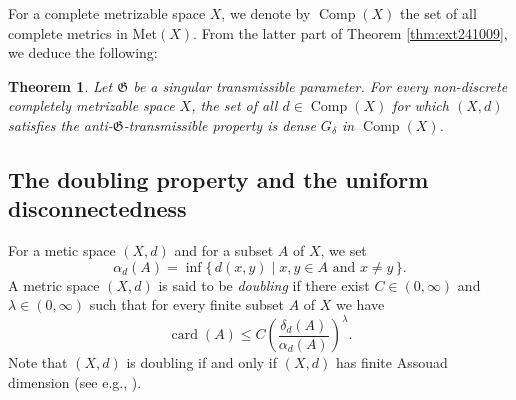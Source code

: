 \documentclass[a4paper, 12pt]{amsart}
\theoremstyle{plain}
\newtheorem{thm}{Theorem}[section]
\theoremstyle{definition}
\theoremstyle{remark}
\DeclareMathOperator{\card}{card}
\DeclareMathOperator{\cm}{Comp}
\newcommand{\met}[1]{\mathrm{Met}(#1)}
\begin{document}
For a complete metrizable space 
$X$, 
we denote by 
$\cm(X)$ the set of 
all complete metrics in 
$\met{X}$. 
From  the latter part of
Theorem 
\ref{thm:ext241009}, 
we deduce the following:
\begin{thm}\label{thm:cm1}
Let 
$\mathfrak{G}$ 
be a singular transmissible parameter. 
For every non-discrete completely metrizable space $X$, 
the set of all 
$d\in \cm(X)$ 
for which 
$(X, d)$ 
satisfies 
the anti-$\mathfrak{G}$-transmissible property 
is dense 
$G_{\delta}$ 
in 
$\cm(X)$.  
\end{thm}

\subsection{The doubling property and the uniform disconnectedness}
For a metic space 
$(X, d)$ 
and for a subset 
$A$ 
of 
$X$, 
we set  
	\[
	\alpha_{d}(A)=\inf\{\, d(x, y)\mid \text{$x, y\in A$ and $x\neq y$}\, \}.
	\] 
A metric space 
$(X, d)$ 
is said to be 
\emph{doubling} 
if there exist 
$C\in (0, \infty)$ 
and 
$\lambda\in (0, \infty)$ 
such that  for every finite subset 
$A$ 
of 
$X$  
we have 
	\[
	\card(A)\le C\left(\frac{\delta_{d}(A)}{\alpha_{d}(A)}\right)^{\lambda}. 
	\]
Note that 
$(X, d)$ 
is doubling if and only if 
$(X, d)$ 
has finite Assouad dimension 
(see e.g., 
 \cite[Section 10]{MR1800917}). 
\end{document}
